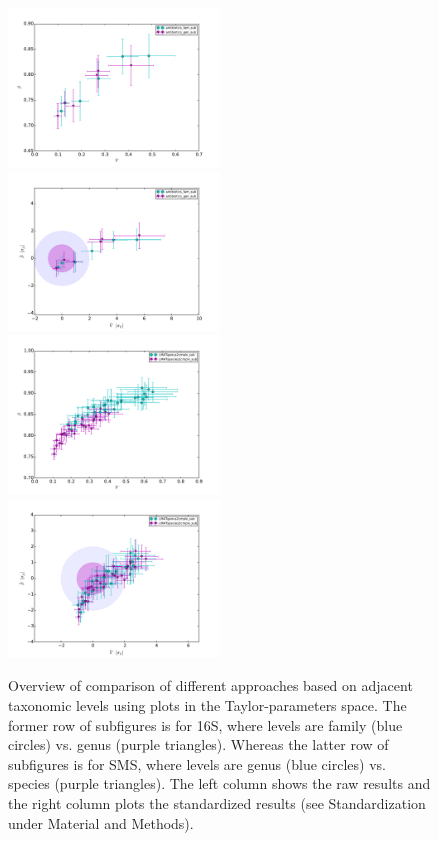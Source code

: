 \begin{figure} 
  \includegraphics[width=0.5\textwidth]{results/taxalevel/sum_raw_16S.pdf}
  \includegraphics[width=0.5\textwidth]{results/taxalevel/sum_sta_16S.pdf}
  \includegraphics[width=0.5\textwidth]{results/taxalevel/sum_raw_SMS.pdf} 
  \includegraphics[width=0.5\textwidth]{results/taxalevel/sum_sta_SMS.pdf}
\caption{Overview of comparison of different approaches based on adjacent taxonomic levels using plots in the Taylor-parameters space. The former row of subfigures is for 16S, where levels are family (blue circles) vs. genus (purple triangles). Whereas the latter row of subfigures is for SMS, where levels are genus (blue circles) vs. species (purple triangles). The left column shows the raw results and the right column plots the standardized results (see Standardization under Material and Methods).}
\label{fig:taxlev1}
\end{figure}

